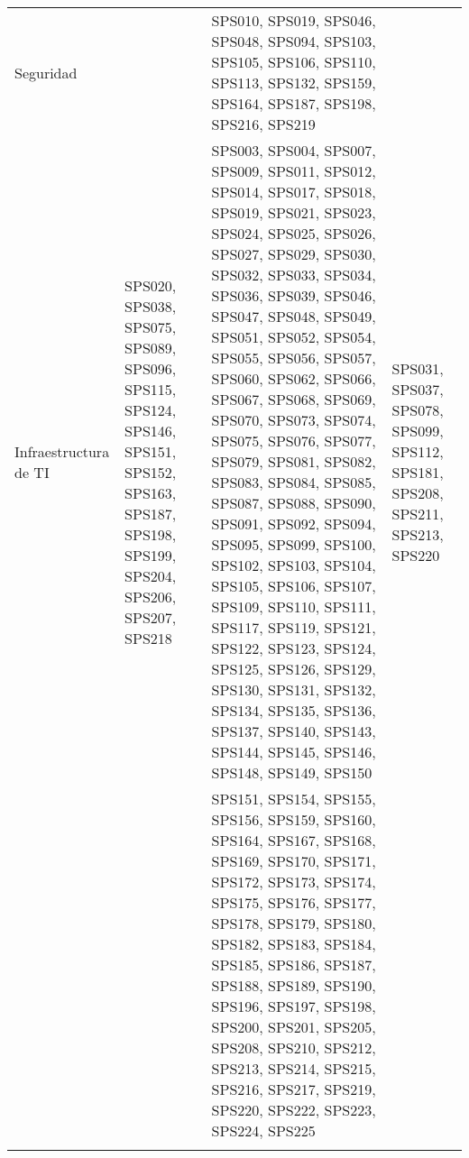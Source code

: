 \begin{longtable}{Z Y Y Y}
\addlinespace
Seguridad &  & SPS010, SPS019, SPS046, SPS048, SPS094, SPS103, SPS105, SPS106, SPS110, SPS113, SPS132, SPS159, SPS164, SPS187, SPS198, SPS216, SPS219 & \\
\addlinespace
Infraestructura de TI & SPS020, SPS038, SPS075, SPS089, SPS096, SPS115, SPS124, SPS146, SPS151, SPS152, SPS163, SPS187, SPS198, SPS199, SPS204, SPS206, SPS207, SPS218 & SPS003, SPS004, SPS007, SPS009, SPS011, SPS012, SPS014, SPS017, SPS018, SPS019, SPS021, SPS023, SPS024, SPS025, SPS026, SPS027, SPS029, SPS030, SPS032, SPS033, SPS034, SPS036, SPS039, SPS046, SPS047, SPS048, SPS049, SPS051, SPS052, SPS054, SPS055, SPS056, SPS057, SPS060, SPS062, SPS066, SPS067, SPS068, SPS069, SPS070, SPS073, SPS074, SPS075, SPS076, SPS077, SPS079, SPS081, SPS082, SPS083, SPS084, SPS085, SPS087, SPS088, SPS090, SPS091, SPS092, SPS094, SPS095, SPS099, SPS100, SPS102, SPS103, SPS104, SPS105, SPS106, SPS107, SPS109, SPS110, SPS111, SPS117, SPS119, SPS121, SPS122, SPS123, SPS124, SPS125, SPS126, SPS129, SPS130, SPS131, SPS132, SPS134, SPS135, SPS136, SPS137, SPS140, SPS143, SPS144, SPS145, SPS146, SPS148, SPS149, SPS150 & SPS031, SPS037, SPS078, SPS099, SPS112, SPS181, SPS208, SPS211, SPS213, SPS220 \\
 & & SPS151, SPS154, SPS155, SPS156, SPS159, SPS160, SPS164, SPS167, SPS168, SPS169, SPS170, SPS171, SPS172, SPS173, SPS174, SPS175, SPS176, SPS177, SPS178, SPS179, SPS180, SPS182, SPS183, SPS184, SPS185, SPS186, SPS187, SPS188, SPS189, SPS190, SPS196, SPS197, SPS198, SPS200, SPS201, SPS205, SPS208, SPS210, SPS212, SPS213, SPS214, SPS215, SPS216, SPS217, SPS219, SPS220, SPS222, SPS223, SPS224, SPS225 & \\
\addlinespace
\bottomrule
\end{longtable}
\twocolumn